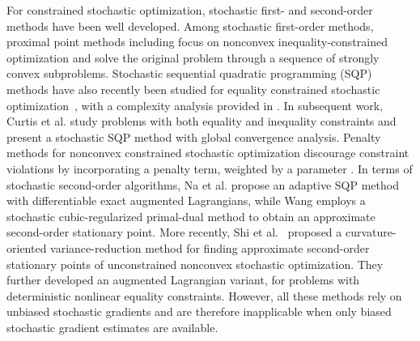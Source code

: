 \documentclass[11pt]{article}
\numberwithin{equation}{section}
\begin{document}
For  constrained stochastic optimization, stochastic first- and second-order methods have been well developed.
Among stochastic first-order methods, 
proximal point methods including \cite{icpp,boob2022level,proxcm-ytb} focus on nonconvex inequality-constrained optimization and solve the original problem through a sequence of strongly convex subproblems. 
Stochastic sequential quadratic programming (SQP) methods have also recently been studied for equality constrained stochastic optimization~\cite{berahas2021sequential,COR,fang2024fully}, with a complexity analysis provided in \cite{COR}. In  subsequent work,  Curtis et al. \cite{Curtis23} study problems with both equality and inequality constraints and present a stochastic SQP method with global convergence analysis. 
Penalty methods for nonconvex constrained stochastic optimization discourage constraint violations by  incorporating a penalty term, weighted by a parameter \cite{alacaoglu2024complexity,cui2025exact,li2026mossp,spd,lu2026variance,SWW,wang2017penalty,pdsg}. 
In terms of stochastic second-order algorithms, Na et al. \cite{na2023adaptive} propose an adaptive SQP method with differentiable exact augmented Lagrangians, while Wang \cite{Wang2024Complexity} employs a stochastic cubic-regularized primal-dual method to obtain an approximate second-order stationary point. More recently, Shi et al.~\cite{shi2026curvature} proposed a
curvature-oriented variance-reduction method for finding approximate
second-order stationary points of unconstrained nonconvex stochastic
optimization. They further developed an augmented Lagrangian variant,
for problems with deterministic nonlinear equality
constraints. 
However, all these methods rely on unbiased stochastic gradients and are therefore inapplicable when only biased stochastic gradient estimates are available.
\end{document}

